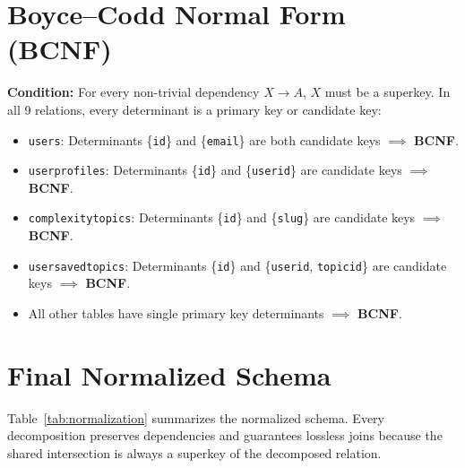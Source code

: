 \documentclass[12pt,a4paper]{report}
\DeclareRobustCommand{\_}{\textunderscore\allowbreak}
\begin{document}
\section{Boyce--Codd Normal Form (BCNF)}
\textbf{Condition:} For every non-trivial dependency $X \rightarrow A$, $X$ must be a superkey.
In all 9 relations, every determinant is a primary key or candidate key:
\begin{itemize}
    \item \texttt{users}: Determinants \{\texttt{id}\} and \{\texttt{email}\} are both candidate keys $\implies$ \textbf{BCNF}.
    \item \texttt{user\_profiles}: Determinants \{\texttt{id}\} and \{\texttt{user\_id}\} are candidate keys $\implies$ \textbf{BCNF}.
    \item \texttt{complexity\_topics}: Determinants \{\texttt{id}\} and \{\texttt{slug}\} are candidate keys $\implies$ \textbf{BCNF}.
    \item \texttt{user\_saved\_topics}: Determinants \{\texttt{id}\} and \{\texttt{user\_id}, \texttt{topic\_id}\} are candidate keys $\implies$ \textbf{BCNF}.
    \item All other tables have single primary key determinants $\implies$ \textbf{BCNF}.
\end{itemize}

\section{Final Normalized Schema}
Table~\ref{tab:normalization} summarizes the normalized schema. Every decomposition preserves dependencies and guarantees lossless joins because the shared intersection is always a superkey of the decomposed relation.
\end{document}
